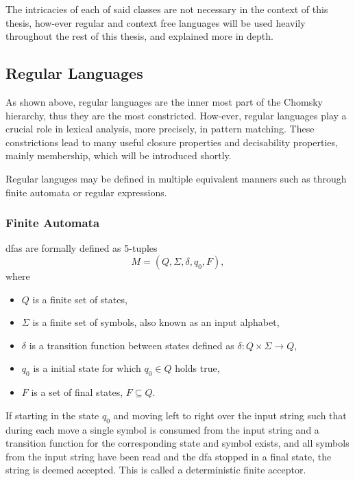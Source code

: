 The intricacies of each of said classes are not necessary in the context of this thesis, how-ever regular and context free languages will be used heavily throughout the rest of this thesis, and explained more in depth.


\subsection{Regular Languages}
As shown above, regular languages are the inner most part of the Chomsky hierarchy, thus they are the most constricted. How-ever, regular languages play a crucial role in lexical analysis, more precisely, in pattern matching. These constrictions lead to many useful closure properties and decisability properties, mainly membership, which will be introduced shortly.

Regular languges may be defined in multiple equivalent manners such as through finite automata or regular expressions. 

\subsubsection{Finite Automata}

\begin{definition}\label{def:dfa}
\glspl{dfa} are formally defined as 5-tuples
$$ M = (Q, \Sigma, \delta, q_0, F),$$ 
where
\begin{itemize}
\item $Q$ is a finite set of states,
\item $\Sigma$ is a finite set of symbols, also known as an input alphabet,
\item $\delta$ is a transition function between states defined as $\delta : Q \times \Sigma \rightarrow Q$,
\item $q_0$ is a initial state for which $q_0 \in Q$ holds true,
\item $F$ is a set of final states, $F \subseteq Q$.
\end{itemize}


If starting in the state $q_0$ and moving left to right over the input string such that during each move a single symbol is consumed from the input string and a transition function for the corresponding state and symbol exists, and all symbols from the input string have been read and the \gls{dfa} stopped in a final state, the string is deemed accepted. This is called a deterministic finite acceptor.
\end{definition}

